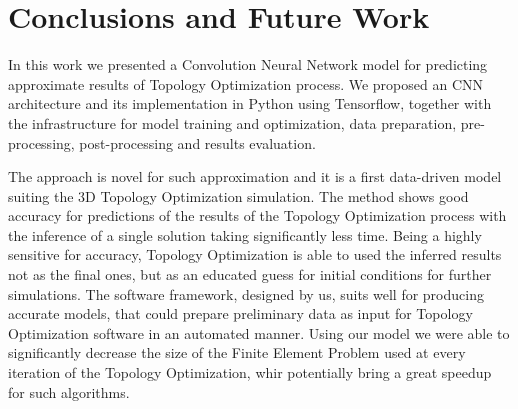 
\chapter{Conclusions and Future Work}
\label{chapter:Conclusion}

In this work we presented a Convolution Neural Network model for predicting approximate results of Topology Optimization process.
We proposed an CNN architecture and its implementation in Python using Tensorflow, together with the infrastructure for model  training and optimization, data preparation, pre-processing, post-processing and results evaluation.
\medskip

The approach is novel for such approximation and it is a first data-driven model suiting the 3D Topology Optimization simulation.
The method shows good accuracy for predictions of the results of the Topology Optimization process with the inference of a single solution taking significantly less time.
Being a highly sensitive for accuracy, Topology Optimization is able to used the inferred results not as the final ones, but as an educated guess for initial conditions for further simulations. 
The software framework, designed by us, suits well for producing accurate models, that could prepare preliminary data as input for Topology Optimization software in an automated manner.
Using our model we were able to significantly decrease the size of the Finite Element Problem used at every iteration of the Topology Optimization, whir potentially bring a great speedup for such algorithms. 
